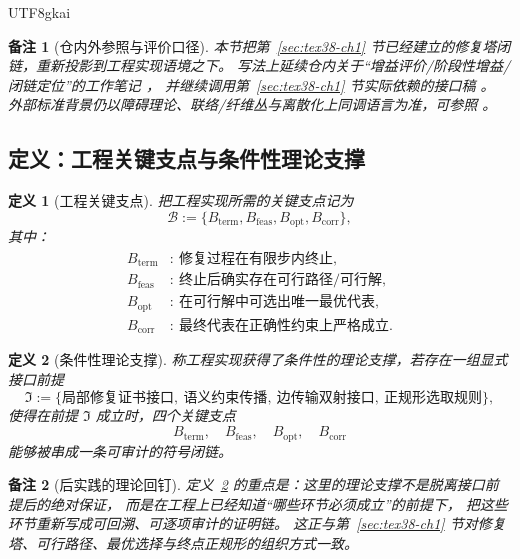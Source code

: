 \documentclass[12pt]{article}
\newtheorem{definition}{定义}[section]
\newtheorem{remark}{备注}[section]
\begin{document}
\begin{CJK*}{UTF8}{gkai}
\begin{remark}[仓内外参照与评价口径]
本节把第~\ref{sec:tex38-ch1} 节已经建立的修复塔闭链，重新投影到工程实现语境之下。
写法上延续仓内关于“增益评价/阶段性增益/闭链定位”的工作笔记
\cite{RepoTex37GainEvaluation,RepoTex28StageGains,RepoTex22DiscussionGains}，
并继续调用第~\ref{sec:tex38-ch1} 节实际依赖的接口稿
\cite{RepoTex20SemanticGaugeNormalization,RepoTex31RepairTower,RepoTex32ConditionalConvergence,
  RepoTex36HomotopyTwistBijection,RepoTex6JacobiGap,GaoZheng2025GFramework,GaoZhengAppVol3}。
外部标准背景仍以障碍理论、联络/纤维丛与离散化上同调语言为准，可参照
\cite{Hatcher2002AT,KobayashiNomizu1963Foundations,Husemoller1994FibreBundles}。
\end{remark}

\subsection{定义：工程关键支点与条件性理论支撑}
\label{subsec:tex38-engineering-pillars}

\begin{definition}[工程关键支点]
\label{def:tex38-engineering-pillars}
把工程实现所需的关键支点记为
\[
  \mathcal{B}
  :=
  \{B_{\mathrm{term}},B_{\mathrm{feas}},B_{\mathrm{opt}},B_{\mathrm{corr}}\},
\]
其中：
\begin{align*}
  B_{\mathrm{term}}&:\ \text{修复过程在有限步内终止},\\
  B_{\mathrm{feas}}&:\ \text{终止后确实存在可行路径/可行解},\\
  B_{\mathrm{opt}}&:\ \text{在可行解中可选出唯一最优代表},\\
  B_{\mathrm{corr}}&:\ \text{最终代表在正确性约束上严格成立}.
\end{align*}
\end{definition}

\begin{definition}[条件性理论支撑]
\label{def:tex38-conditional-support}
称工程实现获得了\emph{条件性的理论支撑}，若存在一组显式接口前提
\[
  \mathfrak{I}
  :=
  \{\text{局部修复证书接口},\ \text{语义约束传播},\ \text{边传输双射接口},\ \text{正规形选取规则}\},
\]
使得在前提 $\mathfrak{I}$ 成立时，四个关键支点
\[
  B_{\mathrm{term}},\quad
  B_{\mathrm{feas}},\quad
  B_{\mathrm{opt}},\quad
  B_{\mathrm{corr}}
\]
能够被串成一条可审计的符号闭链。
\end{definition}

\begin{remark}[后实践的理论回钉]
定义~\ref{def:tex38-conditional-support} 的重点是：这里的理论支撑不是脱离接口前提后的绝对保证，
而是在工程上已经知道“哪些环节必须成立”的前提下，
把这些环节重新写成可回溯、可逐项审计的证明链。
这正与第~\ref{sec:tex38-ch1} 节对修复塔、可行路径、最优选择与终点正规形的组织方式一致。
\end{remark}


\end{CJK*}
\end{document}
